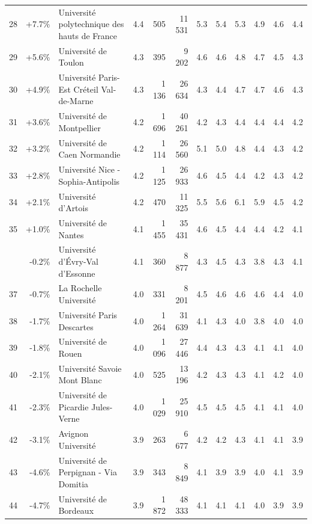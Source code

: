 \documentclass[12pt,french,landscape]{article}
\begin{document}
\begin{longtable}{rrlrrrrrrlrr}
28 & +7.7\% & Université polytechnique des hauts de France & 4.4 & 505 & 11 531 & 5.3 & 5.4 & 5.3 & 4.9 & 4.6 & 4.4\\
\rowcolor{gray!6}  29 & +5.6\% & Université de Toulon & 4.3 & 395 & 9 202 & 4.6 & 4.6 & 4.8 & 4.7 & 4.5 & 4.3\\
30 & +4.9\% & Université Paris-Est Créteil Val-de-Marne & 4.3 & 1 136 & 26 634 & 4.3 & 4.4 & 4.7 & 4.7 & 4.6 & 4.3\\
\addlinespace
\rowcolor{gray!6}  31 & +3.6\% & Université de Montpellier & 4.2 & 1 696 & 40 261 & 4.2 & 4.3 & 4.4 & 4.4 & 4.4 & 4.2\\
32 & +3.2\% & Université de Caen Normandie & 4.2 & 1 114 & 26 560 & 5.1 & 5.0 & 4.8 & 4.4 & 4.3 & 4.2\\
\rowcolor{gray!6}  33 & +2.8\% & Université Nice - Sophia-Antipolis & 4.2 & 1 125 & 26 933 & 4.6 & 4.5 & 4.4 & 4.2 & 4.3 & 4.2\\
34 & +2.1\% & Université d'Artois & 4.2 & 470 & 11 325 & 5.5 & 5.6 & 6.1 & 5.9 & 4.5 & 4.2\\
\rowcolor{gray!6}  35 & +1.0\% & Université de Nantes & 4.1 & 1 455 & 35 431 & 4.6 & 4.5 & 4.4 & 4.4 & 4.2 & 4.1\\
\addlinespace
36 & -0.2\% & Université d'Évry-Val d'Essonne & 4.1 & 360 & 8 877 & 4.3 & 4.5 & 4.3 & 3.8 & 4.3 & 4.1\\
\rowcolor{gray!6}  37 & -0.7\% & La Rochelle Université & 4.0 & 331 & 8 201 & 4.5 & 4.6 & 4.6 & 4.6 & 4.4 & 4.0\\
38 & -1.7\% & Université Paris Descartes & 4.0 & 1 264 & 31 639 & 4.1 & 4.3 & 4.0 & 3.8 & 4.0 & 4.0\\
\rowcolor{gray!6}  39 & -1.8\% & Université de Rouen & 4.0 & 1 096 & 27 446 & 4.4 & 4.3 & 4.3 & 4.1 & 4.1 & 4.0\\
40 & -2.1\% & Université Savoie Mont Blanc & 4.0 & 525 & 13 196 & 4.2 & 4.3 & 4.3 & 4.1 & 4.2 & 4.0\\
\addlinespace
\rowcolor{gray!6}  41 & -2.3\% & Université de Picardie Jules-Verne & 4.0 & 1 029 & 25 910 & 4.5 & 4.5 & 4.5 & 4.1 & 4.1 & 4.0\\
42 & -3.1\% & Avignon Université & 3.9 & 263 & 6 677 & 4.2 & 4.2 & 4.3 & 4.1 & 4.1 & 3.9\\
\rowcolor{gray!6}  43 & -4.6\% & Université de Perpignan - Via Domitia & 3.9 & 343 & 8 849 & 4.1 & 3.9 & 3.9 & 4.0 & 4.1 & 3.9\\
44 & -4.7\% & Université de Bordeaux & 3.9 & 1 872 & 48 333 & 4.1 & 4.1 & 4.1 & 4.0 & 3.9 & 3.9\\

\end{longtable}
\end{document}
